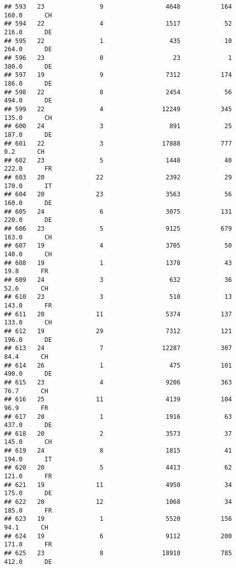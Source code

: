 \documentclass[
]{article}
\begin{document}
\begin{verbatim}
## 593   23               9                 4648           164    160.0      CH
## 594   22               4                 1517            52    216.0      DE
## 595   22               1                  435            10    264.0      DE
## 596   23               0                   23             1    380.0      DE
## 597   19               9                 7312           174    186.0      DE
## 598   22               8                 2454            56    494.0      DE
## 599   22               4                12249           345    135.0      CH
## 600   24               3                  891            25    187.0      DE
## 601   22               3                17888           777      0.2      CH
## 602   23               5                 1448            40    222.0      FR
## 603   20              22                 2392            29    170.0      IT
## 604   20              23                 3563            56    160.0      DE
## 605   24               6                 3075           131    220.0      DE
## 606   23               5                 9125           679    163.0      CH
## 607   19               4                 3705            50    140.0      CH
## 608   19               1                 1378            43     19.8      FR
## 609   24               3                  632            36     52.6      CH
## 610   23               3                  510            13    143.0      FR
## 611   20              11                 5374           137    133.0      CH
## 612   19              29                 7312           121    196.0      DE
## 613   24               7                12287           307     84.4      CH
## 614   26               1                  475           101    490.0      DE
## 615   23               4                 9206           363     76.7      CH
## 616   25              11                 4139           104     96.9      FR
## 617   20               1                 1916            63    437.0      DE
## 618   20               2                 3573            37    145.0      CH
## 619   24               8                 1815            41    194.0      IT
## 620   20               5                 4413            62    121.0      FR
## 621   19              11                 4950            34    175.0      DE
## 622   20              12                 1068            34    185.0      FR
## 623   19               1                 5520           156     94.1      CH
## 624   19               6                 9112           200    171.0      FR
## 625   23               8                18910           785    412.0      DE

\end{verbatim}
\end{document}
